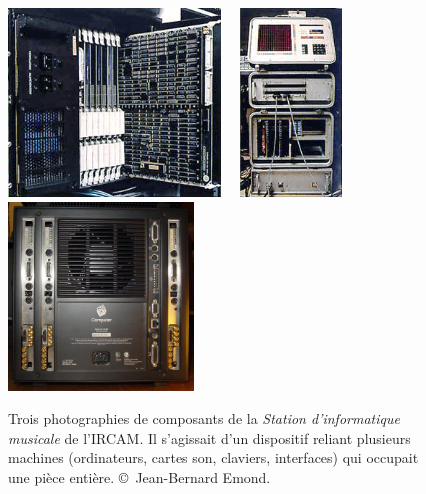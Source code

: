 \documentclass[a4paper,12pt]{article}
\begin{document}
\begin{figure}[h!]
\begin{center}
\includegraphics[height=5cm]{images/sim1.jpg}~~
\includegraphics[height=5cm]{images/sim2.jpg}~~
\includegraphics[height=5cm]{images/sim3.jpg}
\label{simphoto}
\caption{\footnotesize Trois photographies de composants de la \emph{Station d'informatique musicale} de l'IRCAM. Il s'agissait d'un dispositif reliant plusieurs machines (ordinateurs, cartes son, claviers, interfaces) qui occupait une pièce entière. \copyright~Jean-Bernard Emond.}
\end{center}
\end{figure}
\end{document}
